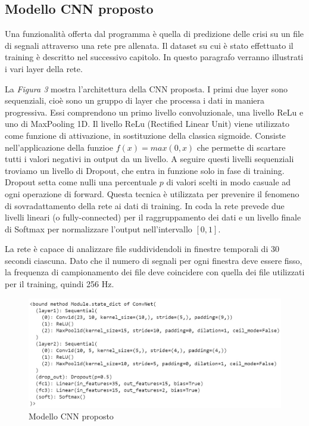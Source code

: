 \documentclass{article}
\begin{document}
\subsection{Modello CNN proposto}
Una funzionalità offerta dal programma è quella di predizione delle crisi su un file di segnali attraverso una rete pre allenata. Il dataset su cui è stato effettuato il training è descritto nel successivo capitolo. In questo paragrafo verranno illustrati i vari layer della rete.

La \textit{Figura 3} mostra l'architettura della CNN proposta. I primi due layer sono sequenziali, cioè sono un gruppo di layer che processa i dati in maniera progressiva. Essi comprendono un primo livello convoluzionale, una livello ReLu e uno di MaxPooling 1D. Il livello ReLu (Rectified Linear Unit) viene utilizzato come funzione di attivazione, in sostituzione della classica sigmoide. Consiste nell'applicazione della funzioe $f(x) = max(0,x)$ che permette di scartare tutti i valori negativi in output da un livello. 
A seguire questi livelli sequenziali troviamo un livello di Dropout, che entra in funzione solo in fase di training. Dropout setta come nulli una percentuale $p$ di valori scelti in modo casuale ad ogni operazione di forward. Questa tecnica è utilizzata per prevenire il fenomeno di sovradattamento della rete ai dati di training.
In coda la rete prevede due livelli lineari (o fully-connected) per il raggruppamento dei dati e un livello finale di Softmax per normalizzare l'output nell'intervallo $[0,1]$.

La rete è capace di analizzare file suddividendoli in finestre temporali di 30 secondi ciascuna. Dato che il numero di segnali per ogni finestra deve essere fisso, la frequenza di campionamento dei file deve coincidere con quella dei file utilizzati per il training, quindi 256 Hz.

\begin{figure}[!h]
\centering
\includegraphics[scale=0.7]{ourcnn}
\caption{Modello CNN proposto}
\end{figure}
\end{document}
